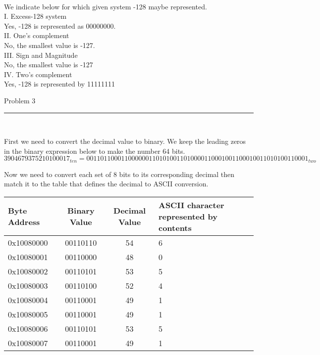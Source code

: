\documentclass[11pt,reqno]{article}
\begin{document}
\noindent {}\\ 
We indicate below for which given system -128 maybe represented.\\

\noindent I. \hspace{12pt}Excess-128 system\\
\indent Yes, -128 is represented as 00000000.\\

\noindent II. \hspace{7pt}One's complement\\
\indent No, the smallest value is -127.\\

\noindent III. \hspace{3pt}Sign and Magnitude\\
\indent No, the smallest value is -127\\

\noindent IV. \hspace{3pt}Two's complement\\
\indent Yes, -128 is represented by 11111111\\

\begin{flushleft} 
Problem 3 \\
\rule{500pt}{1pt}\\
\end{flushleft} 
First we need to convert the decimal value to binary. We keep the leading zeros in the binary expression below to make the number 64 bits.
\[ 3904679375210100017_{ten} = 0011011000110000001101010011010000110001001100010011010100110001_{two}\]

\noindent Now we need to convert each set of 8 bits to its corresponding decimal then match it to the table that defines the decimal to ASCII conversion.\\

\begin{tabular}{| l | c | c | l |}
\hline
Byte Address & Binary Value & Decimal Value &ASCII character represented by contents \\ \hline
0x10080000 & 00110110 & 54 & 6\\ \hline
0x10080001 & 00110000 & 48 & 0\\ \hline
0x10080002 & 00110101 & 53 & 5\\ \hline
0x10080003 & 00110100 & 52 & 4\\ \hline
0x10080004 & 00110001 & 49 & 1\\ \hline
0x10080005 & 00110001 & 49 & 1\\ \hline
0x10080006 & 00110101 & 53 & 5\\ \hline
0x10080007 & 00110001 & 49 & 1\\ \hline
\end{tabular}
\end{document}
